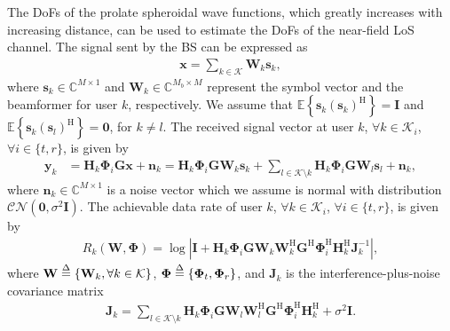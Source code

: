 \documentclass[12pt, draftclsnofoot, onecolumn]{IEEEtran}
\begin{document}
The DoFs of the prolate spheroidal wave functions, which greatly increases with increasing distance, can be used to estimate the DoFs of the near-field LoS channel.
The signal sent by the BS can be expressed as
\begin{equation}
\begin{aligned}
\mathbf{x}=\sum\nolimits_{k\in\mathcal{K}}\mathbf{W}_k\mathbf{s}_k,
\end{aligned}
\end{equation}
where $\mathbf{s}_k\in\mathbb{C}^{M \times 1}$ and $\mathbf{W}_k\in\mathbb{C}^{M_b \times M}$ represent the symbol vector and the beamformer for user $k$, respectively. We assume that $\mathbb{E}\left\{\mathbf{s}_k(\mathbf{s}_k)^\mathrm{H}\right\}=\mathbf{I}$ and $\mathbb{E}\left\{\mathbf{s}_k(\mathbf{s}_{l})^\mathrm{H}\right\}=\mathbf{0}$, for $k\ne l$. The received signal vector at user $k$, $\forall k \in \mathcal{K}_i$, $\forall i \in \{t,r\}$, is given by
\begin{equation}\label{y}
\begin{aligned}
\mathbf{y}_k&=\mathbf{H}_k\mathbf{\Phi}_i\mathbf{G}\mathbf{x}+\mathbf{n}_k=\mathbf{H}_k\mathbf{\Phi}_i\mathbf{G}\mathbf{W}_k\mathbf{s}_k+\sum\nolimits_{l\in\mathcal{K}\setminus k}\mathbf{H}_k\mathbf{\Phi}_i\mathbf{G}\mathbf{W}_{l}\mathbf{s}_{l}+\mathbf{n}_k,
\end{aligned}
\end{equation}
where $\mathbf{n}_k\in\mathbb{C}^{M \times 1}$ is a noise vector which we assume is normal with distribution $\mathcal{CN}\left(\mathbf{0}, \sigma^2\mathbf{I}\right)$. The achievable data rate of user $k$, $\forall k \in \mathcal{K}_i$, $\forall i \in \{t,r\}$, is given by
\begin{equation}\label{R}
\begin{aligned}
R_k\left(\mathbf{W},\mathbf{\Phi}\right)=\log\left|\mathbf{I}+\mathbf{H}_k\mathbf{\Phi}_i\mathbf{G}\mathbf{W}_k\mathbf{W}_k^\mathrm{H}\mathbf{G}^\mathrm{H}\mathbf{\Phi}_i^\mathrm{H}\mathbf{H}_k^\mathrm{H}\mathbf{J}_k^{-1}\right|,
\end{aligned}
\end{equation}
where $\mathbf{W}\buildrel \Delta \over = \{\mathbf{W}_k, \forall k\in\mathcal{K}\}$, $\mathbf{\Phi}\buildrel \Delta \over = \{\mathbf{\Phi}_t,\mathbf{\Phi}_r\}$, and $\mathbf{J}_k$ is the interference-plus-noise covariance matrix
\begin{equation}\label{J}
\begin{aligned}
\mathbf{J}_k=\sum\nolimits_{l\in\mathcal{K}\setminus k}\mathbf{H}_k\mathbf{\Phi}_i\mathbf{G}\mathbf{W}_{l}\mathbf{W}_{l}^\mathrm{H}\mathbf{G}^\mathrm{H}\mathbf{\Phi}_i^\mathrm{H}\mathbf{H}_k^\mathrm{H}+\sigma^2\mathbf{I}.
\end{aligned}
\end{equation}
\end{document}
